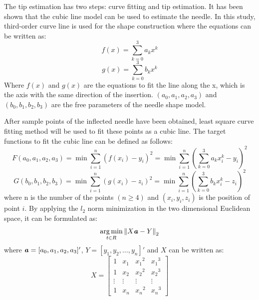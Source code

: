 \documentclass[journal,article,submit,moreauthors,pdftex]{Definitions/mdpi}
\begin{document}
The tip estimation has two steps: curve fitting and tip estimation. It has been shown that the cubic line model can be used to estimate the needle. In this study, third-order curve line is used for the shape construction where the equations can be written as:
\begin{equation}
	f(x)=\sum_{k=0}^{3}a_k x^k
\end{equation}
\begin{equation}
	g(x)=\sum_{k=0}^{3}b_k x^k
\end{equation}
Where ${f(x)}$ and ${g(x)}$ are the equations to fit the line along the x, which is the axis with the same direction of the insertion. ${(a_0,a_1,a_2,a_3)}$ and ${(b_0,b_1,b_2,b_3)}$ are the free parameters of the needle shape model.

After sample points of the inflected needle have been obtained, least square curve fitting method will be used to fit these points as a cubic line. The target functions to fit the cubic line can be defined as follows:
\begin{equation}
F(a_0,a_1,a_2,a_3)=\min\sum_{i=1}^{n}(f(x_i)-y_i)^2 =\min\sum_{i=1}^{n}(\sum_{k=0}^{3}a_k x_i^k-y_i)^2
\end{equation}
\begin{equation}
G(b_0,b_1,b_2,b_3)=\min\sum_{i=1}^{n}(g(x_i)-z_i)^2 =\min\sum_{i=1}^{n}(\sum_{k=0}^{3}b_k x_i^k-z_i)^2
\end{equation}
where n is the number of the points ${(n\geq4)}$ and ${(x_i,y_i,z_i)}$ is the position of point ${i}$. By applying the ${l_2}$ norm minimization in the two dimensional Euclidean space, it can be formulated as:
\begin{equation}
\mathop{\arg\min}_{t\in R} {\|X{\textbf{\textit{a}}}-Y\|}_2
\end{equation}
where ${{\textbf{\textit{a}}}=[a_0,a_1,a_2,a_3]'}$, ${Y=[y_1,y_2,\ldots,y_n]'}$ and ${X}$ can be written as:
\begin{equation}
X= \begin{bmatrix}
1&x_1&{x_1}^2&{x_1}^3\\
1&x_2&{x_2}^2&{x_2}^3\\
\vdots&\vdots&\vdots&\vdots\\
1&x_n&{x_n}^2&{x_n}^3
\end{bmatrix}
\end{equation}
\end{document}
